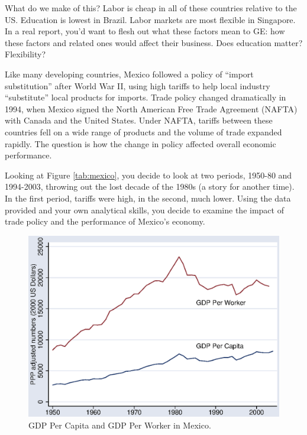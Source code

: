 \documentclass[letterpaper,12pt]{exam}
\begin{document}
\begin{questions}
\begin{solution}
What do we make of this?  
Labor is cheap in all of these countries relative to the US.  
Education is lowest in Brazil.
Labor markets are most flexible in Singapore. 
In a real report, you'd want to flesh out what these factors mean
to GE:  how these factors and related ones would affect their
business.  
Does education matter?  Flexibility?  

\end{solution}

Like many developing countries, 
Mexico followed a policy of ``import substitution'' after World War II, 
using high tariffs to help local industry ``substitute'' 
local products for imports.  
Trade policy changed dramatically in 1994,
when Mexico signed the North American Free Trade Agreement (NAFTA)
with Canada and the United States.
Under NAFTA, tariffs between these countries fell on a wide range 
of products and the volume of trade expanded rapidly.  
The question is how the change in policy affected overall 
economic performance.  

Looking at Figure \ref{tab:mexico}, you decide to look at two periods, 
1950-80 and 1994-2003, throwing out the lost decade of the 1980s 
(a story for another time).  
In the first period, tariffs were high, in the second, much lower.  
Using the data provided and your own analytical skills, you decide to 
examine the impact of trade policy and the performance 
of Mexico's economy.  

\begin{figure}[!]
    \centering
    \includegraphics[scale=0.8]{pwtmexypopyl.eps}
    \caption{GDP Per Capita and GDP Per Worker in Mexico.}
    \label{fig:mexico}
\end{figure}


\end{questions}
\end{document}
